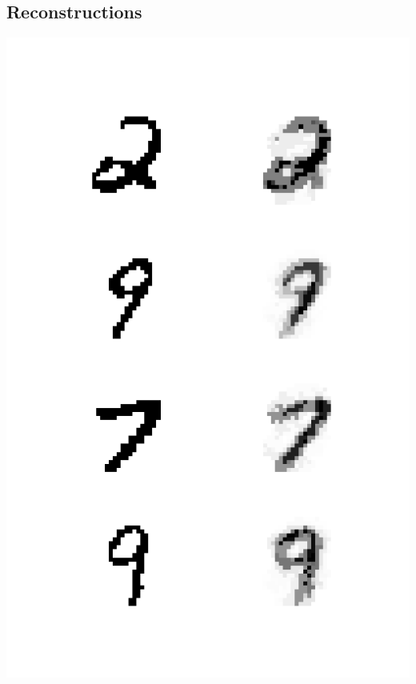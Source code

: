 \documentclass[11pt]{article}
\begin{document}
\subsection*{Reconstructions}
\label{sec-7-2}
\includegraphics[width=.9\linewidth]{figures/recon_1.png}
\end{document}
